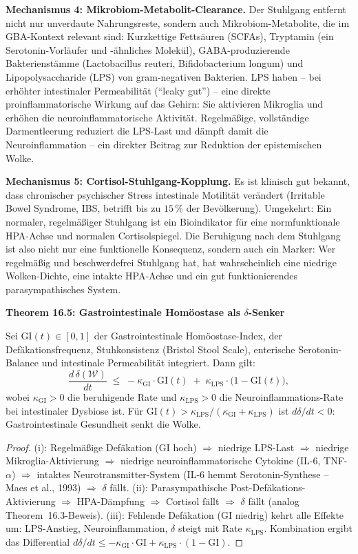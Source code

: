 ﻿\documentclass[12pt,a4paper]{report}
\theoremstyle{plain}
\theoremstyle{definition}
\theoremstyle{remark}
\begin{document}
	\textbf{Mechanismus 4: Mikrobiom-Metabolit-Clearance.}
	Der Stuhlgang entfernt nicht nur unverdaute Nahrungsreste,
	sondern auch Mikrobiom-Metabolite, die im GBA-Kontext
	relevant sind: Kurzkettige Fettsäuren (SCFAs), Tryptamin
	(ein Serotonin-Vorläufer und -ähnliches Molekül),
	GABA-produzierende Bakterienstämme (Lactobacillus reuteri,
	Bifidobacterium longum) und Lipopolysaccharide (LPS)
	von gram-negativen Bakterien.
	LPS haben -- bei erhöhter intestinaler Permeabilität
	(``leaky gut'') -- eine direkte proinflammatorische Wirkung
	auf das Gehirn: Sie aktivieren Mikroglia und erhöhen
	die neuroinflammatorische Aktivität.
	Regelmäßige, vollständige Darmentleerung reduziert die
	LPS-Last und dämpft damit die Neuroinflammation --
	ein direkter Beitrag zur Reduktion der epistemischen Wolke.

	\textbf{Mechanismus 5: Cortisol-Stuhlgang-Kopplung.}
	Es ist klinisch gut bekannt, dass chronischer psychischer Stress
	intestinale Motilität verändert (Irritable Bowel Syndrome, IBS,
	betrifft bis zu $15\,\%$ der Bevölkerung).
	Umgekehrt: Ein normaler, regelmäßiger Stuhlgang ist ein
	Bioindikator für eine normfunktionale HPA-Achse und
	normalen Cortisolspiegel. Die Beruhigung nach dem Stuhlgang
	ist also nicht nur eine funktionelle Konsequenz, sondern
	auch ein Marker: Wer regelmäßig und beschwerdefrei
	Stuhlgang hat, hat wahrscheinlich eine niedrige Wolken-Dichte,
	eine intakte HPA-Achse und ein gut funktionierendes
	parasympathisches System.

	
	\noindent\textbf{Theorem 16.5: Gastrointestinale Homöostase als $\delta$-Senker}

		Sei $\mathrm{GI}(t) \in [0,1]$ der Gastrointestinale Homöo\-sta\-se-Index,
		der Defäka\-tions\-frequenz, Stuhkonsistenz (Bristol Stool Scale),
		enterische Serotonin-Balance und intestinale Permeabilität
		integriert. Dann gilt:
		\[
		\frac{d\,\delta(\mathcal{W})}{dt}
		\;\leq\; -\kappa_{\mathrm{GI}} \cdot \mathrm{GI}(t)
		\;+\; \kappa_{\mathrm{LPS}} \cdot \bigl(1 - \mathrm{GI}(t)\bigr),
		\]
		wobei $\kappa_{\mathrm{GI}} > 0$ die beruhigende Rate und
		$\kappa_{\mathrm{LPS}} > 0$ die Neuroinflammations-Rate
		bei intestinaler Dysbiose ist.
		Für $\mathrm{GI}(t) > \kappa_{\mathrm{LPS}}/(\kappa_{\mathrm{GI}} + \kappa_{\mathrm{LPS}})$
		ist $d\delta/dt < 0$: Gastrointestinale Gesundheit senkt die Wolke.


	\begin{proof}
		(i):
		Regelmäßige Defäkation ($\mathrm{GI}$ hoch) $\Rightarrow$
		niedrige LPS-Last $\Rightarrow$ niedrige Mikroglia-Aktivierung
		$\Rightarrow$ niedrige neuroinflammatorische Cytokine (IL-6, TNF-$\alpha$)
		$\Rightarrow$ intaktes Neuro\-transmitter-System (IL-6 hemmt
		Serotonin-Synthese -- Maes et al., 1993) $\Rightarrow$ $\delta$ fällt.
		(ii): Parasympathische Post-Defäkations-Aktivierung $\Rightarrow$
		HPA-Dämpfung $\Rightarrow$ Cortisol fällt $\Rightarrow$ $\delta$ fällt
		(analog Theorem~16.3-Beweis).
		(iii): Fehlende Defäkation ($\mathrm{GI}$ niedrig) kehrt alle Effekte um:
		LPS-Anstieg, Neuroinflammation, $\delta$ steigt mit Rate $\kappa_{\mathrm{LPS}}$.
		Kombination ergibt das Differential $d\delta/dt\leq -\kappa_{\mathrm{GI}}\cdot\mathrm{GI} + \kappa_{\mathrm{LPS}}\cdot(1-\mathrm{GI})$. \hfill
	\end{proof}
\end{document}
